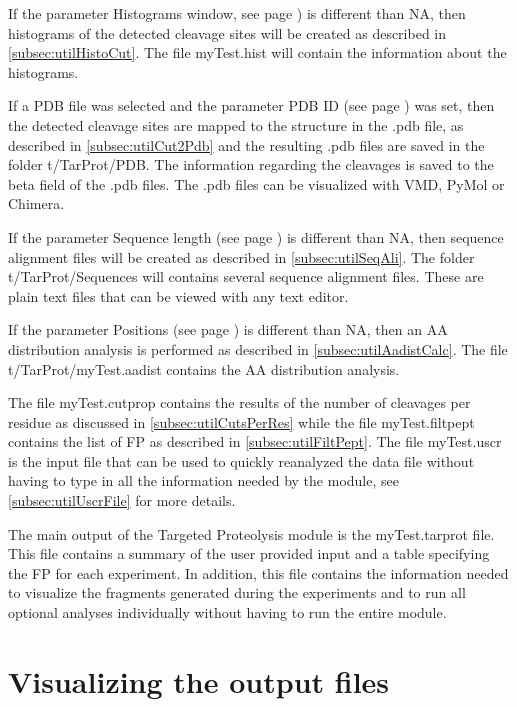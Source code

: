If the parameter Histograms window, see page \pageref{par:tarprotHist}) is different than NA, then histograms of the detected cleavage sites will be created as described in \autoref{subsec:utilHistoCut}. The file myTest.hist will contain the information about the histograms.

If a PDB file was selected and the parameter PDB ID  (see page \pageref{par:tarprotPdbID}) was set, then the detected cleavage sites are mapped to the structure in the .pdb file, as described in \autoref{subsec:utilCut2Pdb} and the resulting .pdb files are saved in the folder t/TarProt/PDB. The information regarding the cleavages is saved to the beta field of the .pdb files. The .pdb files can be visualized with VMD, PyMol or Chimera. 
  
If the parameter Sequence length (see page \pageref{par:tarprotSeqL}) is different than NA, then sequence alignment files will be created as described in \autoref{subsec:utilSeqAli}. The folder t/TarProt/Sequences will contains several sequence alignment files. These are plain text files that can be viewed with any text editor.

If the parameter Positions (see page \pageref{par:tarprotPos}) is different than NA, then an AA distribution analysis is performed as described in \autoref{subsec:utilAadistCalc}. The file t/TarProt/myTest.aadist contains the AA distribution analysis.

The file myTest.cutprop contains the results of the number of cleavages per residue as discussed in \autoref{subsec:utilCutsPerRes} while the file myTest.filtpept contains the list of FP as described in \autoref{subsec:utilFiltPept}. The file myTest.uscr is the input file that can be used to quickly reanalyzed the data file without having to type in all the information needed by the module, see \autoref{subsec:utilUscrFile} for more details. 

The main output of the Targeted Proteolysis module is the myTest.tarprot file. This file contains a summary of the user provided input and a table specifying the FP for each experiment. In addition, this file contains the information needed to visualize the fragments generated during the experiments and to run all optional analyses individually without having to run the entire module.

\section{Visualizing the output files}


